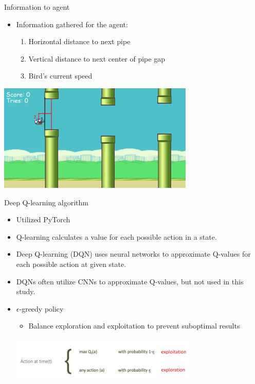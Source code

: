 \documentclass[xcolor=dvipsnames]{beamer}
\begin{document}
\begin{frame}{Information to agent}
    \begin{itemize}
        \item Information gathered for the agent:
        \begin{enumerate}
            \item Horizontal distance to next pipe
            \item Vertical distance to next center of pipe gap
            \item Bird's current speed
        \end{enumerate}
    \end{itemize}
    \begin{center}
        \vspace{0.05cm} %
        \includegraphics[width=0.7\textwidth]{resources/flappy_bird_game_state.png}
    \end{center}
\end{frame}

\begin{frame}{Deep Q-learning algorithm}
    \begin{itemize}
        \item Utilized PyTorch
        \item Q-learning calculates a value for each possible action in a state.
        \item Deep Q-learning (DQN) uses neural networks to approximate Q-values for each possible action at given state.
        \item DQNs often utilize CNNs to approximate Q-values, but not used in this study. 
        \item \(\epsilon\)-greedy policy
        \begin{itemize}
            \item Balance exploration and exploitation to prevent suboptimal results
        \end{itemize}
        \begin{center}
            \vspace{0.05cm} %
            \includegraphics[width=0.7\textwidth]{resources/epsilon_greedy.png}
        \end{center}
    \end{itemize}
\end{frame}
\end{document}
